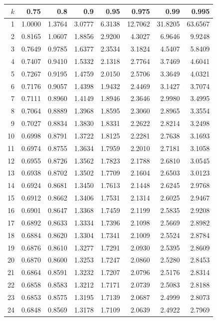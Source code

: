 \begin{center}
    \small
    \begin{tabular}{|r|rrrrrrr|}
        \hline
        $k$&0.75&0.8&0.9&0.95&0.975&0.99&0.995\\
        \hline
        1&1.0000&1.3764&3.0777&6.3138&12.7062&31.8205&63.6567\\
        2&0.8165&1.0607&1.8856&2.9200&4.3027&6.9646&9.9248\\
        3&0.7649&0.9785&1.6377&2.3534&3.1824&4.5407&5.8409\\
        4&0.7407&0.9410&1.5332&2.1318&2.7764&3.7469&4.6041\\
        5&0.7267&0.9195&1.4759&2.0150&2.5706&3.3649&4.0321\\
        6&0.7176&0.9057&1.4398&1.9432&2.4469&3.1427&3.7074\\
        7&0.7111&0.8960&1.4149&1.8946&2.3646&2.9980&3.4995\\%
        8&0.7064&0.8889&1.3968&1.8595&2.3060&2.8965&3.3554\\
        9&0.7027&0.8834&1.3830&1.8331&2.2622&2.8214&3.2498\\
        10&0.6998&0.8791&1.3722&1.8125&2.2281&2.7638&3.1693\\
        11&0.6974&0.8755&1.3634&1.7959&2.2010&2.7181&3.1058\\
        12&0.6955&0.8726&1.3562&1.7823&2.1788&2.6810&3.0545\\
        13&0.6938&0.8702&1.3502&1.7709&2.1604&2.6503&3.0123\\
        14&0.6924&0.8681&1.3450&1.7613&2.1448&2.6245&2.9768\\
        15&0.6912&0.8662&1.3406&1.7531&2.1314&2.6025&2.9467\\
        16&0.6901&0.8647&1.3368&1.7459&2.1199&2.5835&2.9208\\
        17&0.6892&0.8633&1.3334&1.7396&2.1098&2.5669&2.8982\\
        18&0.6884&0.8620&1.3304&1.7341&2.1009&2.5524&2.8784\\
        19&0.6876&0.8610&1.3277&1.7291&2.0930&2.5395&2.8609\\
        20&0.6870&0.8600&1.3253&1.7247&2.0860&2.5280&2.8453\\
        21&0.6864&0.8591&1.3232&1.7207&2.0796&2.5176&2.8314\\
        22&0.6858&0.8583&1.3212&1.7171&2.0739&2.5083&2.8188\\
        23&0.6853&0.8575&1.3195&1.7139&2.0687&2.4999&2.8073\\
        24&0.6848&0.8569&1.3178&1.7109&2.0639&2.4922&2.7969\\

\end{tabular}
\end{center}
